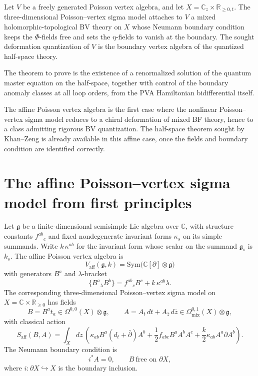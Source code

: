 \begin{problem}
Let $V$ be a freely generated Poisson vertex algebra, and let
$X = \mathbb C_z \times \mathbb R_{\ge 0,t}$.
The three-dimensional Poisson--vertex sigma model attaches to $V$ a mixed holomorphic-topological
BV theory on $X$ whose Neumann boundary condition keeps the $\Phi$-fields free and sets the
$\eta$-fields to vanish at the boundary. The sought deformation quantization of $V$ is the boundary
vertex algebra of the quantized half-space theory.

The theorem to prove is the existence of a renormalized solution of
the quantum master equation on the half-space, together with control
of the boundary anomaly classes at all loop orders, from the PVA
Hamiltonian bidifferential itself.
\end{problem}

\begin{remark}
The affine Poisson vertex algebra is the first case where the nonlinear Poisson--vertex sigma model
reduces to a chiral deformation of mixed BF theory, hence to a class admitting rigorous BV
quantization. The half-space theorem sought by Khan--Zeng is already available in this affine case, once the fields and boundary condition are
identified correctly.
\end{remark}

\section{The affine Poisson--vertex sigma model from first principles}

\begin{setup}
Let $\mathfrak g$ be a finite-dimensional semisimple Lie algebra over $\mathbb C$, with structure constants
$f^{ab}{}_c$ and fixed nondegenerate invariant forms $\kappa_s$ on its simple summands. Write
$k\,\kappa^{ab}$ for the invariant form whose scalar on the summand $\mathfrak g_s$ is $k_s$.
The affine Poisson vertex algebra is
\[
V_{\mathrm{aff}}(\mathfrak g,k) = \mathrm{Sym}\bigl(\mathbb C[\partial] \otimes \mathfrak g\bigr)
\]
with generators $B^a$ and $\lambda$-bracket
\[
\{ B^a{}_{\lambda} B^b \} = f^{ab}{}_c B^c + k\,\kappa^{ab}\lambda.
\]
The corresponding three-dimensional Poisson--vertex sigma model on
$X = \mathbb C \times \mathbb R_{\ge 0}$ has fields
\[
B = B^a t_a \in \Omega^{0,0}(X) \otimes \mathfrak g,
\qquad
A = A_t\,dt + A_{\bar z}\,d\bar z \in \Omega^{0,1}_{\mathrm{mix}}(X) \otimes \mathfrak g,
\]
with classical action
\begin{equation}
\label{eq:affine-kz-action}
S_{\mathrm{aff}}(B,A)
=
\int_X \! dz\,
\left(
\kappa_{ab} B^a (d_t + \bar\partial) A^b
+ \frac{1}{2} f_{abc} B^a A^b A^c
+ \frac{k}{2}\kappa_{ab} A^a \partial A^b
\right).
\end{equation}
The Neumann boundary condition is
\begin{equation}
\label{eq:kz-neumann}
i^*A = 0,
\qquad
B\ \text{free on }\partial X,
\end{equation}
where $i\colon \partial X \hookrightarrow X$ is the boundary inclusion.
\end{setup}

